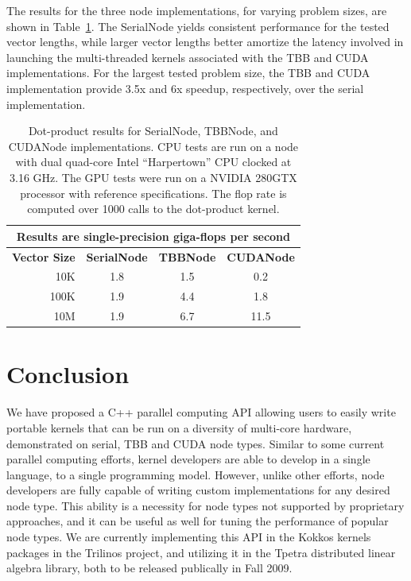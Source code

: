 \documentclass[10pt,conference,letterpaper]{IEEEtran}
\begin{document}
The results for the three node implementations, for varying problem sizes, are shown in Table~\ref{tbl:results}. The SerialNode yields consistent performance for the tested vector lengths, while larger vector lengths better amortize the latency involved in launching the multi-threaded kernels associated with the TBB and CUDA implementations. For the largest tested problem size, the TBB and CUDA implementation provide 3.5x and 6x speedup, respectively, over the serial implementation.

\begin{table}[!h]
\centering

\caption{Dot-product results for SerialNode, TBBNode, and CUDANode implementations. 
CPU tests are run on a node with dual quad-core Intel ``Harpertown'' CPU clocked at 3.16 GHz. The GPU tests were run on a NVIDIA 280GTX processor with reference specifications. The flop rate is computed over 1000 calls to the dot-product kernel.}
\label{tbl:results}

\begin{small}
\begin{tabular}{rccc}
\hline
\multicolumn{4}{c}{Results are single-precision giga-flops per second} \\\hline
{\bfseries Vector Size} & {\bfseries SerialNode} & {\bfseries TBBNode} & {\bfseries CUDANode} \\\hline
10K & 1.8 & 1.5 & 0.2 \\\hline
100K & 1.9 & 4.4 & 1.8  \\\hline
10M & 1.9 & 6.7 & 11.5 \\\hline
\end{tabular}
\end{small}

\end{table}

\section{Conclusion}

We have proposed a C++ parallel computing API allowing users to easily write portable kernels that can be run on a diversity of multi-core hardware, demonstrated on serial, TBB and CUDA node types. Similar to some current parallel computing efforts, kernel developers are able to develop in a single language, to a single programming model. However, unlike other efforts, node developers are fully capable of writing custom implementations for any desired node type. This ability is a necessity for node types not supported by proprietary approaches, and it can be useful as well for tuning the performance of popular node types. We are currently implementing this API in the Kokkos kernels packages in the Trilinos project, and utilizing it in the Tpetra distributed linear algebra library, both to be released publically in Fall 2009.





\end{document}
